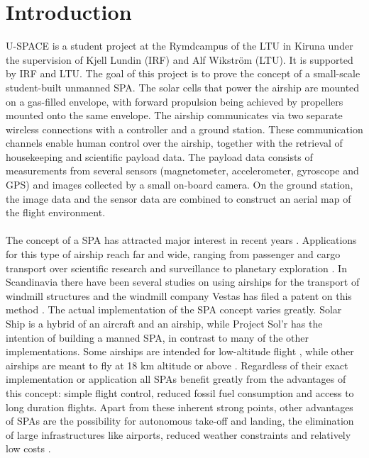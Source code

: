 \newpage
\chapter{Introduction}
\label{chap:introduction}

\ac{U-SPACE} is a student project at the Rymdcampus of the \ac{LTU} in Kiruna under the supervision of Kjell Lundin (\ac{IRF}) and Alf Wikström (\ac{LTU}). It is supported by \ac{IRF} and \ac{LTU}. The goal of this project is to prove the concept of a small-scale student-built unmanned \ac{SPA}. The solar cells that power the airship are mounted on a gas-filled envelope, with forward propulsion being achieved by propellers mounted onto the same envelope. The airship communicates via two separate wireless connections with a controller and a ground station. These communication channels enable human control over the airship, together with the retrieval of housekeeping and scientific payload data. The payload data consists of measurements from several sensors (magnetometer, accelerometer, gyroscope and \ac{GPS}) and images collected by a small on-board camera. On the ground station, the image data and the sensor data are combined to construct an aerial map of the flight environment.
\\
\\
The concept of a \ac{SPA} has attracted major interest in recent years \cite{website:ravenaerostar, website:gaya, poster:saba, report:colozza2004, website:solr, website:ISIS, website:helios, website:solarship, website:knarr}. Applications for this type of airship reach far and wide, ranging from passenger and cargo transport \cite{website:gaya, website:solr, website:helios, website:solarship, website:knarr} over scientific research \cite{poster:saba} and surveillance \cite{website:ravenaerostar, website:ISIS, website:helios} to planetary exploration \cite{report:colozza2004}. In Scandinavia there have been several studies on using airships for the transport of windmill structures \cite{website:knarr, website:energimyndigheten} and the windmill company Vestas has filed a patent on this method \cite{website:vestas}. The actual implementation of the \ac{SPA} concept varies greatly. Solar Ship \cite{website:solarship} is a hybrid of an aircraft and an airship, while Project Sol'r \cite{website:solr} has the intention of building a manned \ac{SPA}, in contrast to many of the other implementations. Some airships are intended for low-altitude flight \cite{website:solr, website:helios}, while other airships are meant to fly at 18 km altitude or above \cite{website:ravenaerostar, poster:saba, website:ISIS}. Regardless of their exact implementation or application all \ac{SPA}s benefit greatly from the advantages of this concept: simple flight control, reduced fossil fuel consumption and access to long duration flights. Apart from these inherent strong points, other advantages of \ac{SPA}s are the possibility for autonomous take-off and landing, the elimination of large infrastructures like airports, reduced weather constraints and relatively low costs \cite{website:ravenaerostar, website:gaya}.
